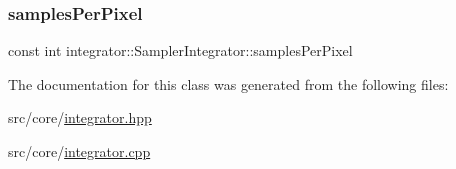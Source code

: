 \subsubsection{\texorpdfstring{samplesPerPixel}{samplesPerPixel}}
{\footnotesize\ttfamily const int integrator\+::\+Sampler\+Integrator\+::samples\+Per\+Pixel}



The documentation for this class was generated from the following files\+:\begin{DoxyCompactItemize}
\item 
src/core/\mbox{\hyperlink{integrator_8hpp}{integrator.\+hpp}}\item 
src/core/\mbox{\hyperlink{integrator_8cpp}{integrator.\+cpp}}\end{DoxyCompactItemize}
